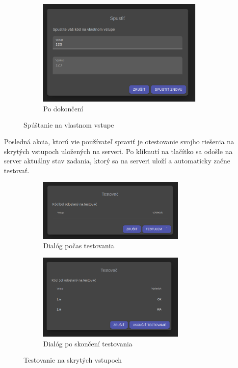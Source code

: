\begin{figure}[H]
\begin{subfigure}{.3\textwidth}
  \includegraphics[width=0.9\textwidth]{images/spusti_dialog_koniec}
  \caption[Po dokončení]{Po dokončení}
  \label{obr:spusti_dialog_koniec}
\end{subfigure}
\caption{Spúštanie na vlastnom vstupe}
\end{figure}

Posledná akcia, ktorú vie používateľ spraviť je otestovanie svojho riešenia na skrytých vstupoch
uložených na serveri. Po kliknutí na tlačítko sa odošle na server aktuálny stav zadania, ktorý sa
na serveri uloží a automaticky začne testovať.
\begin{figure}[H]
\centering
\begin{subfigure}{.5\textwidth}
  \centering
  \includegraphics[width=0.8\textwidth]{images/testovanie_priebeh}
  \caption[Dialóg počas testovania]{Dialóg počas testovania}
  \label{obr:testovanie_priebeh}
\end{subfigure}%
\begin{subfigure}{.5\textwidth}
  \centering
  \includegraphics[width=0.8\textwidth]{images/testovanie_koniec}
  \caption[Dialóg po skončení testovania]{Dialóg po skončení testovania}
  \label{obr:testovanie_koniec}
\end{subfigure}
\caption{Testovanie na skrytých vstupoch}
\end{figure}

